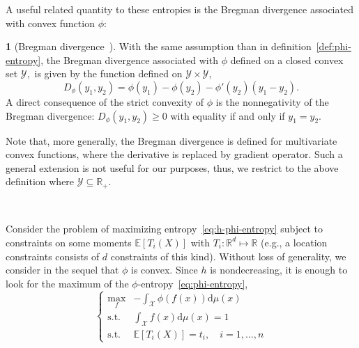 \documentclass[english,sort&compress]{elsarticle}
\theoremstyle{definition}
\newtheorem{defn}{\protect\definitionname}
\theoremstyle{plain}
\theoremstyle{plain}
\providecommand{\definitionname}{Definition}
\def\dmu{\mathrm{d}\mu}
\def\Rset{\mathbb{R}}
\def\X{\mathcal{X}}
\def\Y{\mathcal{Y}}
\newcommand{\Esp}[1]{\mathbb{E}\left[ #1 \right]}
\begin{document}
A  useful  related  quantity  to  these  entropies  is  the  Bregman  divergence
associated with convex function $\phi$:
%
\begin{defn}[Bregman divergence~\cite{Bre67, Bas13}]
\label{def:Bregman}
  With the same assumption than in definition~\ref{def:phi-entropy}, the Bregman
  divergence  associated with $\phi$  defined on  a closed  convex set  $\Y,$ is
  given by the function defined on $\Y \times \Y$,
  \begin{equation}\label{eq:Bregman}
    D_\phi(y_1,y_2) = \phi(y_1) - \phi(y_2) - \phi'(y_2) \left(y_1-y_2\right).
  \end{equation}
  A direct consequence of the strict convexity of $\phi$ is the nonnegativity of
  the Bregman divergence:  $D_\phi(y_1,y_2) \ge 0$ with equality  if and only if
  $y_1 = y_2$.
\end{defn}

Note that,  more generally, the  Bregman divergence is defined  for multivariate
convex functions, where the derivative  is replaced by gradient operator. Such a
general extension  is not  useful for  our purposes, thus,  we restrict  to the
above definition where $\Y \subseteq \Rset_+$.

\

Consider the  problem of maximizing  entropy~\eqref{eq:h-phi-entropy} subject to
constraints  on some moments  $\Esp{T_i(X)}$ with  $T_i: \Rset^d  \mapsto \Rset$
(e.g.,   a  location   constraints  consists   of  $d$   constraints   of  this
kind). Without  loss of  generality, we  consider in the  sequel that  $\phi$ is
convex.  Since $h$ is nondecreasing, it is enough to look for the maximum of the
$\phi$-entropy~\eqref{eq:phi-entropy},
%
\begin{equation}\label{eq:MaxEnt}
\begin{cases}
\max_f & \displaystyle - \int_\X \phi(f(x)) \dmu(x)\\[5mm]
\text{s.t. } & \displaystyle \int_\X f(x) \dmu(x) = 1\\[5mm]
\text{s.t. } & \Esp{T_i(X)} = t_i, \quad i=1,\ldots,n
\end{cases}
\end{equation}
\end{document}
